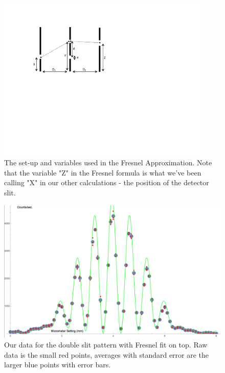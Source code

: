 \documentclass[prb,preprint]{revtex4-1}
\begin{document}
\begin{figure}[h!]
\centering
\includegraphics[width=4in]{fresnel_diagram.pdf}
\caption{The set-up and variables used in the Fresnel Approximation. Note that the variable "Z" in the Fresnel formula is what we've been calling "X" in our other calculations - the position of the detector slit.}
\label{Fresnel_diagram}
\end{figure}

\begin{figure}[h!]
\centering
\includegraphics[width=6in]{double_slit_Fresnel_plot.png}
\caption{Our data for the double slit pattern with Fresnel fit on top.  Raw data is the small red points, averages with standard error are the larger blue points with error bars. }
\label{double_slit_Fresnel_plot}
\end{figure}
\end{document}
